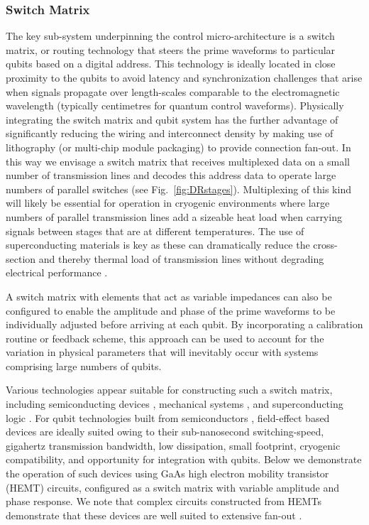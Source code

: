 \subsubsection{Switch Matrix}
The key sub-system underpinning the control micro-architecture is a switch matrix, or routing technology that steers the prime waveforms to particular qubits based on a digital address. This technology is ideally located in close proximity to the qubits to avoid latency and synchronization challenges that arise when signals propagate over length-scales comparable to the electromagnetic wavelength (typically centimetres for quantum control waveforms). Physically integrating the switch matrix and qubit system has the further advantage of significantly reducing the wiring and interconnect density by making use of lithography (or multi-chip module packaging) to provide connection fan-out. In this way we envisage a switch matrix that receives multiplexed data on a small number of transmission lines and decodes this address data to operate large numbers of parallel switches (see Fig.~\ref{fig:DRstages}). Multiplexing of this kind will likely be essential for operation in cryogenic environments where large numbers of parallel transmission lines add a sizeable heat load when carrying signals between stages that are at different temperatures. The use of superconducting materials is key as these can dramatically reduce the cross-section and thereby thermal load of transmission lines without degrading electrical performance \cite{783703}.

A switch matrix with elements that act as variable impedances can also be configured to enable the amplitude and phase of the prime waveforms to be individually adjusted before arriving at each qubit. By incorporating a calibration routine or feedback scheme, this approach can be used to account for the variation in physical parameters that will inevitably occur with systems comprising large numbers of qubits.

Various technologies appear suitable for constructing such a switch matrix, including semiconducting devices \cite{doi:10.1063/1.4807768,doi:10.1063/1.4811376,doi:10.1063/1.4932012}, mechanical systems \cite{969936,S1759078711000729}, and superconducting logic \cite{doi:10.1063/1.3585849,Johnson_2010}. For qubit technologies built from semiconductors \cite{PhysRevLett.110.046805,PhysRevB.88.035121}, field-effect based devices are ideally suited owing to their sub-nanosecond switching-speed, gigahertz transmission bandwidth, low dissipation, small footprint, cryogenic compatibility, and opportunity for integration with qubits. Below we demonstrate the operation of such devices using GaAs high electron mobility transistor (HEMT) circuits, configured as a switch matrix with variable amplitude and phase response. We note that complex circuits constructed from HEMTs demonstrate that these devices are well suited to extensive fan-out \cite{90083}.


